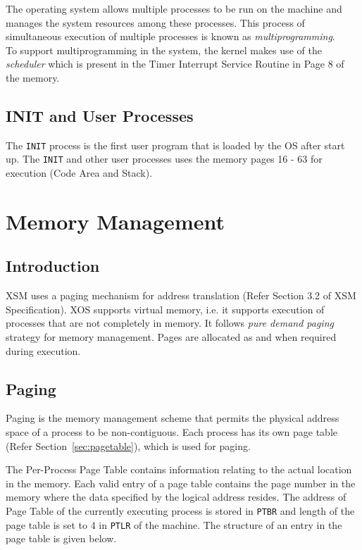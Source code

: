 \documentclass[10pt]{report}
\begin{document}
The operating system allows multiple processes to be run on the machine and manages the system resources among these processes. This process of simultaneous execution of multiple processes is known as \emph{multiprogramming}.  \\

To support multiprogramming in the system, the kernel makes use of the \emph{scheduler} which is present in the Timer Interrupt Service Routine in Page 8 of the memory.

\section{INIT and User Processes}
\label{sec:init and userprogs}

The \texttt{INIT} process is the first user program that is loaded by the OS after start up. The \texttt{INIT} and other user processes uses the memory pages 16 - 63 for execution (Code Area and Stack). 





\chapter{Memory Management}
\label{chp:memory management}
\section{Introduction}

XSM uses a paging mechanism for address translation (Refer Section 3.2 of XSM Specification). XOS supports virtual memory, i.e. it supports execution of processes that are not completely in memory. It follows \textit{pure demand paging} strategy for memory management. Pages are allocated as and when required during execution. 

\section{Paging}
\label{sec:paging}

Paging is the memory management scheme that permits the physical address space of a process to be non-contiguous. Each process has its own page table (Refer Section~\ref{sec:pagetable}), which is used for paging. 

 The Per-Process Page Table contains information relating to the actual location in the memory. Each valid entry of a page table contains the page number in the memory where the data specified by the logical address resides. The address of Page Table of the currently executing process is stored in \texttt{PTBR} and length of the page table is set to 4 in \texttt{PTLR} of the machine. The structure of an entry in the page table is given below.
\end{document}
